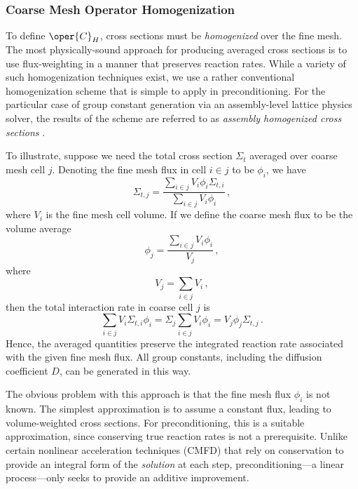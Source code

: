 \subsubsection{Coarse Mesh Operator Homogenization}

To define $\oper{C}_H$, cross sections must be \emph{ homogenized} over 
the fine  mesh.  The most physically-sound approach for producing averaged 
cross sections is to use flux-weighting in a manner that preserves reaction
rates.  While a variety of such homogenization techniques exist, we use 
a rather conventional homogenization scheme that is simple to apply  
in preconditioning.  For the particular case of group constant generation
via an assembly-level lattice physics solver, the results of the scheme are 
referred to as \emph{ assembly homogenized cross sections} \cite{smith1980shm}.

To illustrate, suppose we need the total cross section $\Sigma_t$ averaged 
over coarse mesh cell $j$.  Denoting the fine mesh flux in cell $i \in j$ to 
be $\phi_i$, we have
\begin{equation}
  \Sigma_{t,j} = \frac{ \sum_{i \in j} V_i \phi_i \Sigma_{t, i} }
                      { \sum_{i \in j} V_i \phi_i } \, , 
\end{equation}
where $V_i$ is the fine mesh cell volume. If we define the coarse mesh 
flux to be the volume average
\begin{equation}
 \phi_j = \frac{\sum_{i \in j} V_ i \phi_i} {V_j} \, ,
\end{equation}
where 
\begin{equation}
 V_j = \sum_{i \in j} V_i \, ,
\end{equation}
then the total interaction rate in coarse cell $j$ is
\begin{equation}
 \sum_{i \in j} V_i \Sigma_{t, i} \phi_i =  
    \Sigma_j  \sum_{i \in j} V_i \phi_i =
    V_j \phi_j \Sigma_{t, j} \, .
\end{equation}
Hence, the averaged quantities preserve the integrated reaction
rate associated with the given fine mesh flux.  All group constants,
including the diffusion coefficient $D$, can be generated in this way.

The obvious problem with this approach is that the fine mesh flux 
$\phi_i$ is not known. The simplest approximation is to assume a 
constant flux, leading to  volume-weighted cross sections.  For 
preconditioning,  this is a suitable approximation, since 
conserving true reaction rates is not a prerequisite.  Unlike 
certain nonlinear acceleration techniques (\eg CMFD) that rely on 
conservation to provide an integral form of the \emph{ solution} at 
each step, preconditioning---a linear process---only seeks to provide 
an additive improvement.

